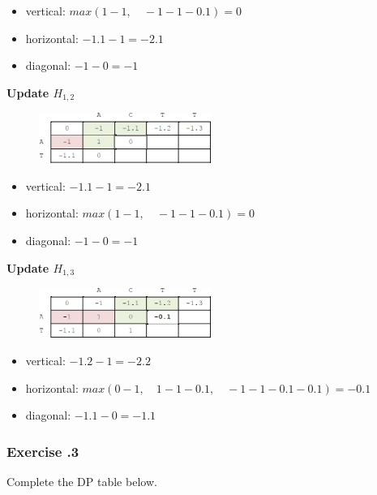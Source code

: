 \begin{itemize}
\item vertical:   $max(1 - 1, \quad -1 - 1 - 0.1) = 0$
\item horizontal: $-1.1 - 1 = -2.1$
\item diagonal: $-1 - 0 = -1$
\end{itemize}

\null \medskip 
\textbf{Update $H_{1,2}$}

\begin{figure}[H]
  \centering
      \includegraphics[width=0.5\textwidth]{fig03/dp_general_gap_example_2.png}
\end{figure}

\begin{itemize}
\item vertical: $-1.1 - 1 = -2.1$
\item horizontal: $max(1 - 1, \quad -1 - 1 - 0.1) = 0$
\item diagonal: $-1 - 0 = -1$
\end{itemize}

\null \medskip 
\textbf{Update $H_{1,3}$}

\begin{figure}[H]
  \centering
      \includegraphics[width=0.5\textwidth]{fig03/dp_general_gap_example_3.png}
\end{figure}

\begin{itemize}
\item vertical: $-1.2 - 1 = -2.2$
\item horizontal: $max(0 - 1, \quad 1 - 1 - 0.1, \quad  -1 -1 - 0.1 - 0.1) = -0.1$
\item diagonal: $-1.1 - 0 = -1.1$
\end{itemize}


%
%
\subsubsection*{Exercise \thesection.3}
Complete the DP table below.

